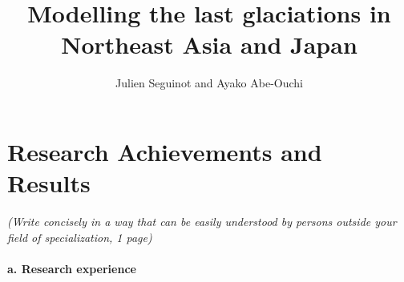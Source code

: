 \documentclass{article}
\title{Modelling the last glaciations in Northeast Asia and Japan}
\author{Julien Seguinot and Ayako Abe-Ouchi}
\begin{document}

\maketitle


\setcounter{section}{15}
\section{Research Achievements and Results}

    \emph{(Write concisely in a way that can be easily understood by persons
          outside your field of specialization, 1 page)}

\paragraph{a. Research experience}
\end{document}
